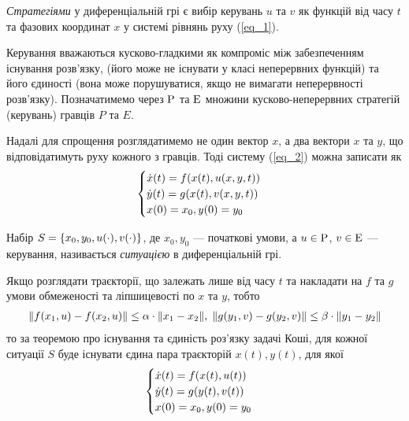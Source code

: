 \begin{definition}
    \emph{Стратегіями} у диференціальній грі є вибір керувань $u$ та $v$ як функцій від часу $t$ та
фазових координат $x$ у системі рівнянь руху (\ref{eq_1}).
\end{definition}
Керування вважаються кусково-гладкими як компроміс між забезпеченням існування розв'язку,
(його може не існувати у класі неперервних функцій) та його єдиності (вона може порушуватися, якщо не вимагати неперервності розв'язку).
Позначатимемо через $\rm P$ та $\rm E$ множини кусково-неперервних стратегій (керувань) гравців $P$ та $E$. 

Надалі для спрощення розглядатимемо не один вектор $x$, а два вектори $x$ та $y$, що відповідатимуть руху кожного з гравців. Тоді
систему (\ref{eq_2}) можна записати як
\begin{gather}\label{eq_3}
    \begin{cases}
        \dot{x}(t) = f(x(t), u(x, y, t)) \\
        \dot{y}(t) = g(x(t), v(x, y, t)) \\
        x(0) = x_0, y(0) = y_0
    \end{cases}
\end{gather}

\begin{definition}
    Набір $S = \left\{x_0, y_0, u(\cdot), v(\cdot) \right\}$, де $x_0, y_0$ --- початкові умови, а $u \in \rm P$, $v \in \rm E$ --- керування, 
    називається \emph{ситуацією} в диференціальній грі. 
\end{definition}
Якщо розглядати траєкторії, що залежать лише від часу $t$ та накладати на $f$ та $g$ умови
обмеженості та ліпшицевості по $x$ та $y$, тобто
\begin{gather*}
    \Vert f(x_1, u) - f(x_2, u) \Vert \leq \alpha \cdot \Vert x_1 - x_2 \Vert, \;
    \Vert g(y_1, v) - g(y_2, v) \Vert \leq \beta \cdot \Vert y_1 - y_2 \Vert
\end{gather*}
то за теоремою про існування та єдиність роз'язку задачі Коші, для кожної ситуації $S$ буде існувати єдина пара траєкторій $x(t), y(t)$,
для якої
\begin{gather*}
    \begin{cases}
        \dot{x}(t) = f(x(t), u(t)) \\
        \dot{y}(t) = g(y(t), v(t)) \\
        x(0) = x_0, y(0) = y_0
    \end{cases}
\end{gather*}

